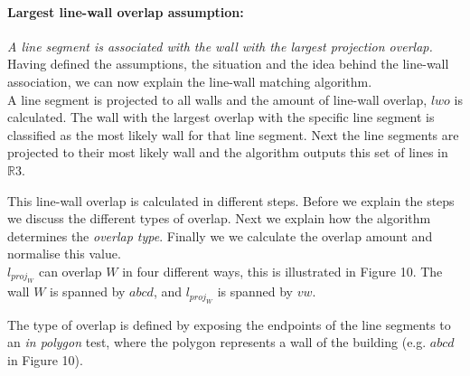 	\paragraph{Largest line-wall overlap assumption:}
	\emph{A line segment is associated with the wall with the largest projection
	overlap.}\\
	Having defined the assumptions, the situation and the idea behind the
	line-wall association, we can now explain the line-wall matching algorithm.\\ 

	A line segment is projected to all walls and the amount of line-wall
	overlap, $lwo$ is calculated. The wall with the largest overlap with the specific line
segment is classified as the most likely wall for that line segment.
	Next the line segments are projected to their most likely wall and the
	algorithm outputs this set of lines in $\mathbb{R}3$. 
	

	This line-wall overlap is calculated in different steps.
	Before we explain the steps we discuss the different types of overlap. Next
	we explain how the algorithm determines the \emph{overlap type}. Finally we
	we calculate the overlap amount and normalise this value.\\

	$l_{proj_W}$ can overlap $W$ in four different ways, this is illustrated 
	in Figure 10. The wall $W$ is spanned by $abcd$, and $l_{proj_W}$ is spanned
	by $vw$.
	
		
	\clearpage


	The type of overlap is defined by exposing the endpoints of the line
	segments to an \emph{in polygon} test, where the polygon represents a 
	wall of the building (e.g. $abcd$ in Figure 10).

